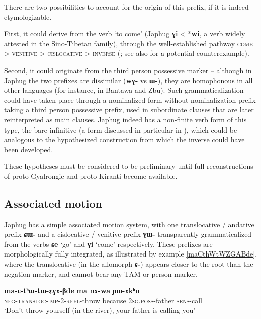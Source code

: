 \documentclass[oldfontcommands,oneside,a4paper,11pt]{article}
\newcommand{\ipa}[1]{\mbox{\phon\textbf{#1}}} %
\begin{document}
There are two possibilities to account for the origin of this prefix, if it is indeed etymologizable. 

First, it could derive from the verb `to come' (Japhug \ipa{ɣi} < *\ipa{wi}, a verb widely attested in the Sino-Tibetan family), through the well-established pathway \textsc{come} > \textsc{venitive} > \textsc{cislocative} > \textsc{inverse} (\citealt{jacques14inverse}; see also \citealt{konnerth15cisloc} for a potential counterexample).

Second, it could originate from the third person possessive marker -- although in Japhug the two prefixes are dissimilar (\ipa{wɣ-} vs \ipa{ɯ-}), they are homophonous in all other languages (for instance, in Bantawa and Zbu). Such grammaticalization could have taken place through a nominalized form without nominalization prefix taking a third person possessive prefix, used in subordinate clauses that are later reinterpreted as main clauses.  Japhug indeed has a non-finite verb form of this type, the bare infinitive (a form discussed in particular in \citealt{jacques14antipassive}), which could be analogous to the hypothesized construction from which the inverse could have been developed.

These hypotheses must be considered to be preliminary until full reconstructions of proto-Gyalrongic and proto-Kiranti become available.

\subsection{Associated motion} \label{sec:motion}
Japhug has a simple associated motion system, with one translocative / andative prefix \ipa{ɕɯ-} and a cislocative / venitive prefix \ipa{ɣɯ-} transparently grammaticalized from the verbs \ipa{ɕe} `go' and \ipa{ɣi} `come' respectively. These prefixes are morphologically fully integrated, as illustrated by example \ref{maCthWtWZGABde}, where the translocative (in the allomorph \ipa{ɕ-}) appears closer to the root than the negation marker, and cannot bear any TAM or person marker.  

\begin{exe}
\ex \label{maCthWtWZGABde}
\gll \ipa{ma-ɕ-tʰɯ-tɯ-ʑɣɤ-βde} 	\ipa{ma} 	\ipa{nɤ-wa} 	\ipa{ɲɯ-ɤkʰu}   \\
\textsc{neg-transloc-imp-2-refl}-throw because \textsc{2sg.poss}-father \textsc{sens}-call \\
\glt `Don't throw yourself (in the river), your father is calling you' 
\end{exe}
\end{document}
